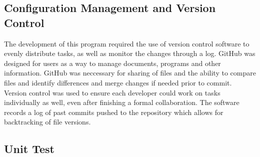 \documentclass[12pt, a4]{report}
\begin{document}
	
	\pagebreak
	\subsection{Configuration Management and Version Control}
		\par 
		The development of this program required the use of version control software to evenly distribute tasks, as well as monitor the changes through a log. GitHub was designed for users as a way to manage documents, programs and other information. GitHub was neccessary for sharing of files and the ability to compare files and identify differences and merge changes if needed prior to commit. Version control was used to ensure each developer could work on tasks individually as well, even after finishing a formal collaboration. The software records a log of past commits pushed to the repository which allows for backtracking of file versions.
	
	\subsection{Unit Test}
\end{document}
